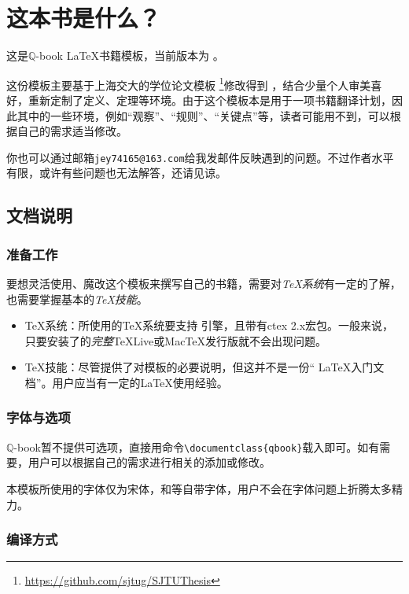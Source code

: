 \chapter{这本书是什么？}

这是$\mathbb{ Q}$-book \LaTeX 书籍模板，当前版本为 \version 。

这份模板主要基于上海交大的学位论文模板
\footnote{\url{https://github.com/sjtug/SJTUThesis}}修改得到
，结合少量个人审美喜好，重新定制了定义、定理等环境。由于这个模板本是用于一项书籍翻译计划，因此其中的一些环境，例如“观察”、“规则”、“关键点”等，读者可能用不到，可以根据自己的需求适当修改。

你也可以通过邮箱\texttt{jey74165@163.com}给我发邮件反映遇到的问题。不过作者水平有限，或许有些问题也无法解答，还请见谅。

\section{文档说明}

\subsection{准备工作}

要想灵活使用、魔改这个模板来撰写自己的书籍，需要对\emph{TeX系统}有一定的了解，也需要掌握基本的\emph{TeX技能}。

\begin{itemize}[noitemsep,topsep=0pt,parsep=0pt,partopsep=0pt]
	\item {\TeX}系统：所使用的{\TeX}系统要支持 \XeTeX 引擎，且带有ctex 2.x宏包。一般来说，只要安装了的\emph{完整}TeXLive或MacTeX发行版就不会出现问题。
	\item TeX技能：尽管提供了对模板的必要说明，但这并不是一份“ \LaTeX 入门文档”。用户应当有一定的\LaTeX 使用经验。
\end{itemize}

\subsection{字体与选项}

$\mathbb{ Q }$-book暂不提供可选项，直接用命令\verb|\documentclass{qbook}|载入即可。如有需要，用户可以根据自己的需求进行相关的添加或修改。

本模板所使用的字体仅为宋体，{}和{}等自带字体，用户不会在字体问题上折腾太多精力。

\subsection{编译方式}


